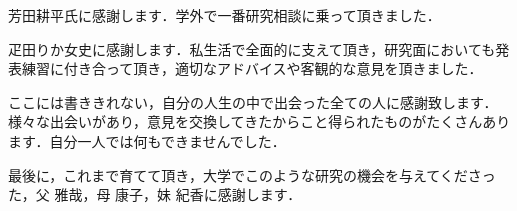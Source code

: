 芳田耕平氏に感謝します．学外で一番研究相談に乗って頂きました．

疋田りか女史に感謝します．私生活で全面的に支えて頂き，研究面においても発表練習に付き合って頂き，適切なアドバイスや客観的な意見を頂きました．

ここには書ききれない，自分の人生の中で出会った全ての人に感謝致します．様々な出会いがあり，意見を交換してきたからこと得られたものがたくさんあります．自分一人では何もできませんでした．

最後に，これまで育てて頂き，大学でこのような研究の機会を与えてくださった，父 雅哉，母 康子，妹 紀香に感謝します．



